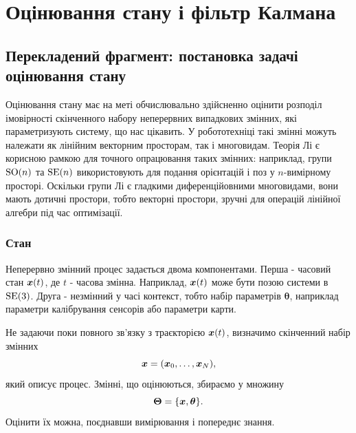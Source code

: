 \chapter{Оцінювання стану і фільтр Калмана}

\section{Перекладений фрагмент: постановка задачі оцінювання стану}


Оцінювання стану має на меті обчислювально здійсненно оцінити розподіл імовірності скінченного набору неперервних випадкових змінних, які параметризують систему, що нас цікавить. У робототехніці такі змінні можуть належати як лінійним векторним просторам, так і многовидам. Теорія Лі є корисною рамкою для точного опрацювання таких змінних: наприклад, групи $\mathrm{SO}(n)$ та $\mathrm{SE}(n)$ використовують для подання орієнтацій і поз у $n$-вимірному просторі. Оскільки групи Лі є гладкими диференційовними многовидами, вони мають дотичні простори, тобто векторні простори, зручні для операцій лінійної алгебри під час оптимізації.

\subsection{Стан}

Неперервно змінний процес задається двома компонентами. Перша - часовий стан $\bm{x}(t)$, де $t$ - часова змінна. Наприклад, $\bm{x}(t)$ може бути позою системи в $\mathrm{SE}(3)$. Друга - незмінний у часі контекст, тобто набір параметрів $\bm{\theta}$, наприклад параметри калібрування сенсорів або параметри карти.

Не задаючи поки повного зв'язку з траєкторією $\bm{x}(t)$, визначимо скінченний набір змінних
\begin{equation}
    \bm{x} = (\bm{x}_0,\dots,\bm{x}_N),
\end{equation}
який описує процес. Змінні, що оцінюються, збираємо у множину
\begin{equation}
    \bm{\Theta} = \{\bm{x},\bm{\theta}\}.
\end{equation}
Оцінити їх можна, поєднавши вимірювання і попереднє знання.

